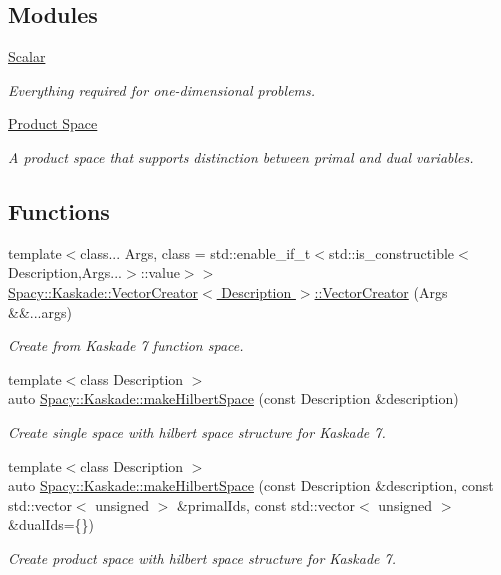 \subsection*{\-Modules}
\begin{DoxyCompactItemize}
\item 
\hyperlink{group__ScalarGroup}{\-Scalar}
\begin{DoxyCompactList}\small\item\em \-Everything required for one-\/dimensional problems. \end{DoxyCompactList}\item 
\hyperlink{group__ProductSpaceGroup}{\-Product Space}
\begin{DoxyCompactList}\small\item\em \-A product space that supports distinction between primal and dual variables. \end{DoxyCompactList}\end{DoxyCompactItemize}
\subsection*{\-Functions}
\begin{DoxyCompactItemize}
\item 
{\footnotesize template$<$class... \-Args, class  = std\-::enable\-\_\-if\-\_\-t$<$std\-::is\-\_\-constructible$<$\-Description,\-Args...$>$\-::value$>$$>$ }\\\hyperlink{group__VectorSpaceGroup_ga89de372343310640870077e6167df3f4}{\-Spacy\-::\-Kaskade\-::\-Vector\-Creator$<$ Description $>$\-::\-Vector\-Creator} (\-Args \&\&...args)
\begin{DoxyCompactList}\small\item\em \-Create from \-Kaskade 7 function space. \end{DoxyCompactList}\item 
{\footnotesize template$<$class Description $>$ }\\auto \hyperlink{group__VectorSpaceGroup_ga04d45446864bbf87770d02eade7b64cf}{\-Spacy\-::\-Kaskade\-::make\-Hilbert\-Space} (const \-Description \&description)
\begin{DoxyCompactList}\small\item\em \-Create single space with hilbert space structure for \-Kaskade 7. \end{DoxyCompactList}\item 
{\footnotesize template$<$class Description $>$ }\\auto \hyperlink{group__VectorSpaceGroup_ga221db25c41371a2a823a6b569d735ef6}{\-Spacy\-::\-Kaskade\-::make\-Hilbert\-Space} (const \-Description \&description, const std\-::vector$<$ unsigned $>$ \&primal\-Ids, const std\-::vector$<$ unsigned $>$ \&dual\-Ids=\{\})
\begin{DoxyCompactList}\small\item\em \-Create product space with hilbert space structure for \-Kaskade 7. \end{DoxyCompactList}\end{DoxyCompactItemize}


